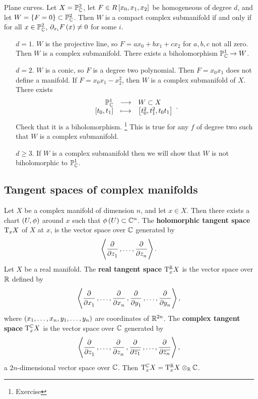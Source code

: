 \begin{example}
Plane curves. Let $ X = \mathbb{P}_{\mathbb{C}}^2 $, let $ F \in R\sbr{x_0, x_1, x_2} $ be homogeneous of degree $ d $, and let $ W = \cbr{F = 0} \subset \PP_\CC^2 $. Then $ W $ is a compact complex submanifold if and only if for all $ x \in \mathbb{P}_{\mathbb{C}}^2 $, $ \partial_{x_i} F\br{x} \ne 0 $ for some $ i $.
\begin{itemize}[leftmargin=0.5in]
\item[$ d = 1 $.] $ W $ is the projective line, so $ F = ax_0 + bx_1 + cx_2 $ for $ a, b, c $ not all zero. Then $ W $ is a complex submanifold. There exists a biholomorphism $ \mathbb{P}_{\mathbb{C}}^1 \to W $.
\item[$ d = 2 $.] $ W $ is a conic, so $ F $ is a degree two polynomial. Then $ F = x_0x_1 $ does not define a manifold. If $ F = x_0x_1 - x_2^2 $, then $ W $ is a complex submanifold of $ X $. There exists
$$ \function{\PP_\CC^1}{W \subset X}{\sbr{t_0, t_1}}{\sbr{t_0^2, t_1^2, t_0t_1}}. $$
Check that it is a biholomorphism. \footnote{Exercise} This is true for any $ f $ of degree two such that $ W $ is a complex submanifold.
\item[$ d \ge 3 $.] If $ W $ is a complex submanifold then we will show that $ W $ is not biholomorphic to $ \mathbb{P}_{\mathbb{C}}^1 $.
\end{itemize}
\end{example}

\subsection{Tangent spaces of complex manifolds}

\begin{definition}
Let $ X $ be a complex manifold of dimension $ n $, and let $ x \in X $. Then there exists a chart $ \br{U, \phi} $ around $ x $ such that $ \phi\br{U} \subset \CC^n $. The \textbf{holomorphic tangent space} $ \mathrm{T}_xX $ of $ X $ at $ x $, is the vector space over $ \mathbb{C} $ generated by
$$ \abr{\dpd{}{z_1}, \dots, \dpd{}{z_n}}. $$
Let $ X $ be a real manifold. The \textbf{real tangent space} $ \mathrm{T}_x^{\mathbb{R}} X $ is the vector space over $ \mathbb{R} $ defined by
$$ \abr{\dpd{}{x_1}, \dots, \dpd{}{x_n}, \dpd{}{y_1}, \dots, \dpd{}{y_n}}, $$
where $ \br{x_1, \dots, x_n, y_1, \dots, y_n} $ are coordinates of $ \mathbb{R}^{2n} $. The \textbf{complex tangent space} $ \mathrm{T}_x^{\mathbb{C}} X $ is the vector space over $ \mathbb{C} $ generated by
$$ \abr{\dpd{}{z_1}, \dots, \dpd{}{z_n}, \dpd{}{\overline{z_1}}, \dots, \dpd{}{\overline{z_n}}}, $$
a $ 2n $-dimensional vector space over $ \mathbb{C} $. Then $ \mathrm{T}_x^{\mathbb{C}} X = \mathrm{T}_x^{\mathbb{R}} X \otimes_{\mathbb{R}} \mathbb{C} $.
\end{definition}

